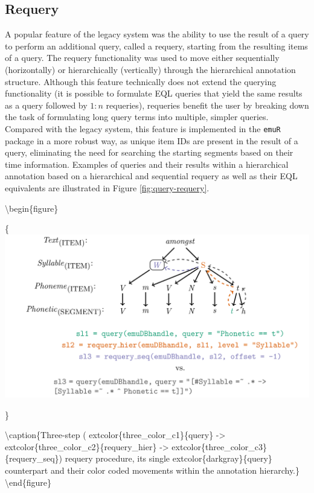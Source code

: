 \documentclass[]{book}
\theoremstyle{definition}
\theoremstyle{definition}
\theoremstyle{definition}
\theoremstyle{remark}
\begin{document}
\hypertarget{subsec:requery}{%
\subsection{Requery}\label{subsec:requery}}

A popular feature of the legacy system was the ability to use the result
of a query to perform an additional query, called a requery, starting
from the resulting items of a query. The requery functionality was used
to move either sequentially (horizontally) or hierarchically
(vertically) through the hierarchical annotation structure. Although
this feature technically does not extend the querying functionality (it
is possible to formulate EQL queries that yield the same results as a
query followed by \(1:n\) requeries), requeries benefit the user by
breaking down the task of formulating long query terms into multiple,
simpler queries. Compared with the legacy system, this feature is
implemented in the \texttt{emuR} package in a more robust way, as unique
item IDs are present in the result of a query, eliminating the need for
searching the starting segments based on their time information.
Examples of queries and their results within a hierarchical annotation
based on a hierarchical and sequential requery as well as their EQL
equivalents are illustrated in Figure \ref{fig:query-requery}.

\textbackslash{}begin\{figure\}

\{\centering \includegraphics[width=0.75\linewidth]{pics/requery}

\}

\textbackslash{}caption\{Three-step (
extcolor\{three\_color\_c1\}\{query\} -\textgreater{}
extcolor\{three\_color\_c2\}\{requery\_hier\} -\textgreater{}
extcolor\{three\_color\_c3\}\{requery\_seq\}) requery procedure, its
single extcolor\{darkgray\}\{query\} counterpart and their color coded
movements within the annotation hierarchy.\}\label{fig:query-requery}
\textbackslash{}end\{figure\}
\end{document}
